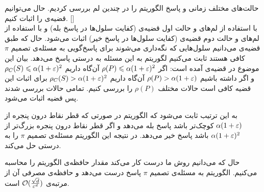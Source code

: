 حالت‌های مختلف زمانی و پاسخ الگوریتم را در چندین لم بررسی کردیم. حال می‌توانیم قضیه‌ی   را اثبات کنیم.
[]\\
با استفاده از لم‌های  و  حالت اول قضیه‌ی  (کفایت سلول‌ها در پاسخ بله) و با استفاده از لم‌های  و  حالت دوم قضیه‌ی  (کفایت سلول‌ها در پاسخ خیر) اثبات می‌شود. 
حال که طبق قضیه‌ی  می‌دانیم سلول‌هایی که نگه‌داری می‌شوند برای پاسخ‌گویی به مسئله‌ی تصمیم $\pi$ کافی هستند ثابت می‌کنیم لگوریتم  به این مسئله  به درستی پاسخ می‌دهد. بیان این موضوع در قضیه‌ی  آمده است:
اگر 
$ \rho(P) \leqslant \alpha (1 + \varepsilon) ^ 2 $
‌آن‌گاه داریم
$ \rho_C(S) \leqslant  \alpha (1 + \varepsilon) ^ 2 $
و اگر داشته باشیم
$ \rho(P) > \alpha (1 + \varepsilon) $
آن‌گاه داریم
$ \rho_C(S) > \alpha (1 + \varepsilon) ^ 2 $
برای اثبات این قضیه کافی است حالات مختلف $\rho(P)$ را بررسی کنیم.
تمامی حالات بررسی شدند پس قضیه اثبات می‌شود.

به این ترتیب ثابت می‌شود که الگوریتم  در صورتی که قطر نقاط درون پنجره از $\alpha ( 1+\varepsilon)$ کوچک‌تر باشد پاسخ بله می‌دهد و اگر قطر نقاط درون پنجره بزرگ‌تر از $\alpha (1+\varepsilon)^2$ باشد پاسخ خیر می‌دهد. در نتیجه این الگوریتم مسئله‌ی تصمیم $\pi$ را به درستی حل می‌کند.

حال که می‌دانیم روش ما درست کار می‌کند مقدار حافظه‌ی الگوریتم  را محاسبه می‌کنیم.
الگوریتم  به مسئله‌ی تصمیم $\pi$ پاسخ درست می‌دهد و حافظه‌ی مصرفی آن از مرتبه‌ی 
$\mathcal{O}(\frac{\sqrt{d}}{\varepsilon^d})$
است.
 
